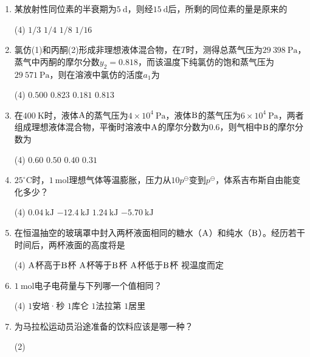 \begin{enumerate}[label=\arabic*., itemsep=1.5ex]
\begin{tasks}
    \end{tasks}
    \item 某放射性同位素的半衰期为$5\ \mathrm{d}$，则经$15\ \mathrm{d}$后，所剩的同位素的量是原来的
    \begin{tasks}(4)
        \task $1/3$
        \task $1/4$
        \task $1/8$
        \task $1/16$
    \end{tasks}
    \item 氯仿(1)和丙酮(2)形成非理想液体混合物，在$T$时，测得总蒸气压为$29\ 398\ \mathrm{Pa}$，蒸气中丙酮的摩尔分数$y_2=0.818$，而该温度下纯氯仿的饱和蒸气压为$29\ 571\ \mathrm{Pa}$，则在溶液中氯仿的活度$a_1$为
    \begin{tasks}(4)
        \task $0.500$
        \task $0.823$
        \task $0.181$
        \task $0.813$
    \end{tasks}
    \item 在$400\ \mathrm{K}$时，液体$\ce{A}$的蒸气压为$4\times10^4\ \mathrm{Pa}$，液体$\ce{B}$的蒸气压为$6\times10^4\ \mathrm{Pa}$，两者组成理想液体混合物，平衡时溶液中$\ce{A}$的摩尔分数为$0.6$，则气相中$\ce{B}$的摩尔分数为
    \begin{tasks}(4)
        \task $0.60$
        \task $0.50$
        \task $0.40$
        \task $0.31$
    \end{tasks}
    \item $25^\circ\mathrm{C}$时，$1\ \mathrm{mol}$理想气体等温膨胀，压力从$10p^\ominus$变到$p^\ominus$，体系吉布斯自由能变化多少？
    \begin{tasks}(4)
        \task $0.04\ \mathrm{kJ}$
        \task $-12.4\ \mathrm{kJ}$
        \task $1.24\ \mathrm{kJ}$
        \task $-5.70\ \mathrm{kJ}$
    \end{tasks}
    \item 在恒温抽空的玻璃罩中封入两杯液面相同的糖水（$\ce{A}$）和纯水（$\ce{B}$）。经历若干时间后，两杯液面的高度将是
    \begin{tasks}(4)
        \task $\ce{A}$杯高于$\ce{B}$杯
        \task $\ce{A}$杯等于$\ce{B}$杯
        \task $\ce{A}$杯低于$\ce{B}$杯
        \task 视温度而定
    \end{tasks}
    \item $1\ \mathrm{mol}$电子电荷量与下列哪一个值相同？
    \begin{tasks}(4)
        \task $1$安培·秒
        \task $1$库仑
        \task $1$法拉第
        \task $1$居里
    \end{tasks}
    \item 为马拉松运动员沿途准备的饮料应该是哪一种？
    \begin{tasks}(2)

\end{tasks}
\end{enumerate}
